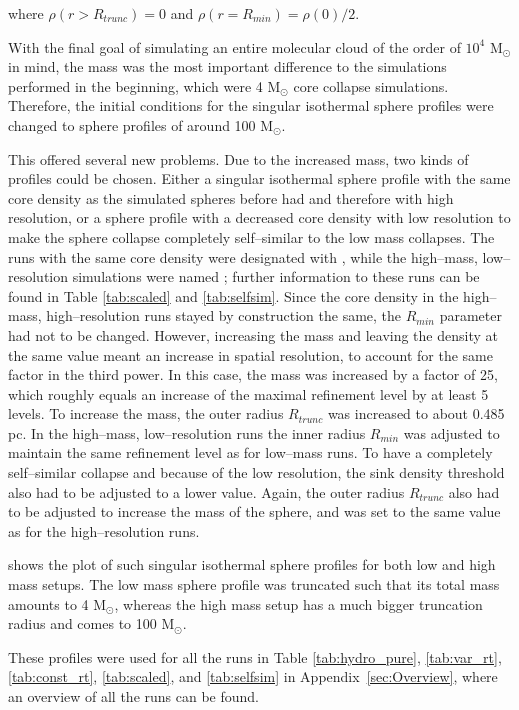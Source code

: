 where $\rho(r>R_{trunc}) = 0$ and $\rho(r=R_{min})=\rho(0)/2$.

With the final goal of simulating an entire molecular cloud of the order of $10^{4}$ M$_{\odot}$ in mind, the mass was the most important difference to the simulations performed in the beginning, which were 4 M$_{\odot}$ core collapse simulations.
Therefore, the initial conditions for the singular isothermal sphere profiles were changed to sphere profiles of around 100 M$_{\odot}$.

This offered several new problems.
Due to the increased mass, two kinds of profiles could be chosen.
Either a singular isothermal sphere profile with the same core density as the simulated spheres before had and therefore with high resolution, or a sphere profile with a decreased core density with low resolution to make the sphere collapse completely self--similar to the low mass collapses.
The runs with the same core density were designated with , while the high--mass, low--resolution simulations were named ; further information to these runs can be found in Table \ref{tab:scaled} and \ref{tab:selfsim}.
Since the core density in the high--mass, high--resolution runs stayed by construction the same, the $R_{min}$ parameter had not to be changed.
However, increasing the mass and leaving the density at the same value meant an increase in spatial resolution, to account for the same factor in the third power.
In this case, the mass was increased by a factor of 25, which roughly equals an increase of the maximal refinement level by at least 5 levels.
To increase the mass, the outer radius $R_{trunc}$ was increased to about 0.485 pc.
In the high--mass, low--resolution runs the inner radius $R_{min}$ was adjusted to maintain the same refinement level as for low--mass runs.
To have a completely self--similar collapse and because of the low resolution, the sink density threshold also had to be adjusted to a lower value.
Again, the outer radius $R_{trunc}$ also had to be adjusted to increase the mass of the sphere, and was set to the same value as for the high--resolution runs.

 shows the plot of such singular isothermal sphere profiles for both low and high mass setups.
The low mass sphere profile was truncated such that its total mass amounts to 4 M$_{\odot}$, whereas the high mass setup has a much bigger truncation radius and comes to 100 M$_{\odot}$.

These profiles were used for all the runs in Table \ref{tab:hydro_pure}, \ref{tab:var_rt}, \ref{tab:const_rt}, \ref{tab:scaled}, and \ref{tab:selfsim} in Appendix~\ref{sec:Overview}, where an overview of all the runs can be found.

